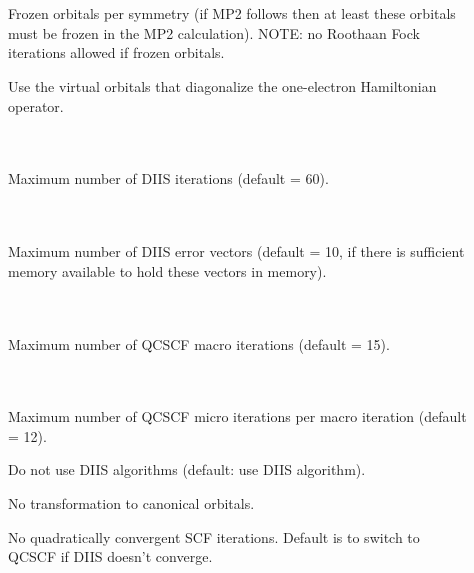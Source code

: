\begin{description}
\item[] \ \\
   \\
  Frozen orbitals per symmetry (if MP2 follows then at least these orbitals
  must be frozen in the MP2 calculation).
  NOTE: no Roothaan Fock iterations allowed if frozen orbitals.

\item[] Use the virtual orbitals that diagonalize the
  one-electron Hamiltonian operator.

\item[] \ \\
   \\
  Maximum number of DIIS iterations (default = 60).

\item[] \ \\
   \\
  Maximum number of DIIS error vectors
  (default = 10, if there is sufficient memory available to hold these
  vectors in memory).

\item[] \ \\
   \\
  Maximum number of QCSCF macro
 iterations (default = 15).


\item[] \ \\
   \\
  Maximum number of QCSCF micro iterations per macro iteration (default = 12).

\item[]
  Do not use DIIS algorithms (default: use DIIS algorithm).

\item[]
  No transformation to canonical orbitals.

\item[]
  No quadratically convergent SCF iterations.
  Default is to switch to QCSCF if DIIS doesn't converge.


\end{description}
